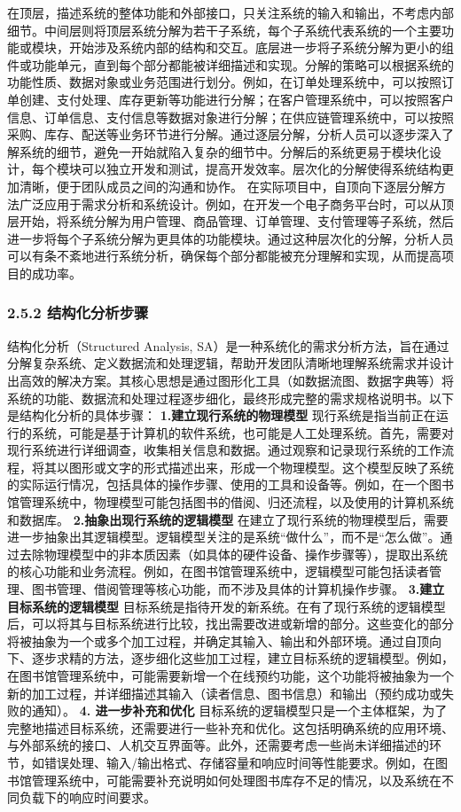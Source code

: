 在顶层，描述系统的整体功能和外部接口，只关注系统的输入和输出，不考虑内部细节。中间层则将顶层系统分解为若干子系统，每个子系统代表系统的一个主要功能或模块，开始涉及系统内部的结构和交互。底层进一步将子系统分解为更小的组件或功能单元，直到每个部分都能被详细描述和实现。分解的策略可以根据系统的功能性质、数据对象或业务范围进行划分。例如，在订单处理系统中，可以按照订单创建、支付处理、库存更新等功能进行分解；在客户管理系统中，可以按照客户信息、订单信息、支付信息等数据对象进行分解；在供应链管理系统中，可以按照采购、库存、配送等业务环节进行分解。通过逐层分解，分析人员可以逐步深入了解系统的细节，避免一开始就陷入复杂的细节中。分解后的系统更易于模块化设计，每个模块可以独立开发和测试，提高开发效率。层次化的分解使得系统结构更加清晰，便于团队成员之间的沟通和协作。 在实际项目中，自顶向下逐层分解方法广泛应用于需求分析和系统设计。例如，在开发一个电子商务平台时，可以从顶层开始，将系统分解为用户管理、商品管理、订单管理、支付管理等子系统，然后进一步将每个子系统分解为更具体的功能模块。通过这种层次化的分解，分析人员可以有条不紊地进行系统分析，确保每个部分都能被充分理解和实现，从而提高项目的成功率。 \subsubsection{2.5.2 结构化分析步骤}\label{ux7ed3ux6784ux5316ux5206ux6790ux6b65ux9aa4} 结构化分析（Structured Analysis, SA）是一种系统化的需求分析方法，旨在通过分解复杂系统、定义数据流和处理逻辑，帮助开发团队清晰地理解系统需求并设计出高效的解决方案。其核心思想是通过图形化工具（如数据流图、数据字典等）将系统的功能、数据流和处理过程逐步细化，最终形成完整的需求规格说明书。以下是结构化分析的具体步骤： \textbf{1.建立现行系统的物理模型} 现行系统是指当前正在运行的系统，可能是基于计算机的软件系统，也可能是人工处理系统。首先，需要对现行系统进行详细调查，收集相关信息和数据。通过观察和记录现行系统的工作流程，将其以图形或文字的形式描述出来，形成一个物理模型。这个模型反映了系统的实际运行情况，包括具体的操作步骤、使用的工具和设备等。例如，在一个图书馆管理系统中，物理模型可能包括图书的借阅、归还流程，以及使用的计算机系统和数据库。 \textbf{2.抽象出现行系统的逻辑模型} 在建立了现行系统的物理模型后，需要进一步抽象出其逻辑模型。逻辑模型关注的是系统``做什么''，而不是``怎么做''。通过去除物理模型中的非本质因素（如具体的硬件设备、操作步骤等），提取出系统的核心功能和业务流程。例如，在图书馆管理系统中，逻辑模型可能包括读者管理、图书管理、借阅管理等核心功能，而不涉及具体的计算机操作步骤。 \textbf{3.建立目标系统的逻辑模型} 目标系统是指待开发的新系统。在有了现行系统的逻辑模型后，可以将其与目标系统进行比较，找出需要改进或新增的部分。这些变化的部分将被抽象为一个或多个加工过程，并确定其输入、输出和外部环境。通过自顶向下、逐步求精的方法，逐步细化这些加工过程，建立目标系统的逻辑模型。例如，在图书馆管理系统中，可能需要新增一个在线预约功能，这个功能将被抽象为一个新的加工过程，并详细描述其输入（读者信息、图书信息）和输出（预约成功或失败的通知）。 \textbf{4. 进一步补充和优化} 目标系统的逻辑模型只是一个主体框架，为了完整地描述目标系统，还需要进行一些补充和优化。这包括明确系统的应用环境、与外部系统的接口、人机交互界面等。此外，还需要考虑一些尚未详细描述的环节，如错误处理、输入/输出格式、存储容量和响应时间等性能要求。例如，在图书馆管理系统中，可能需要补充说明如何处理图书库存不足的情况，以及系统在不同负载下的响应时间要求。 